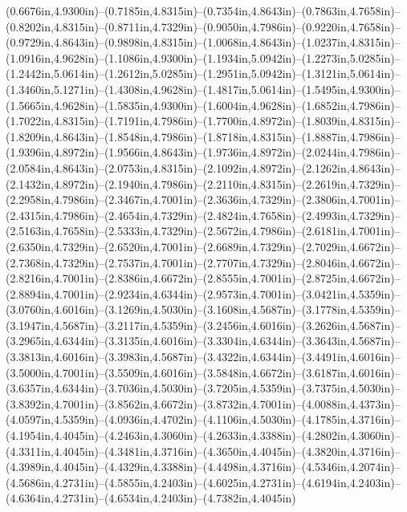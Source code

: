 (0.6676in,4.9300in)--(0.7185in,4.8315in)--(0.7354in,4.8643in)--(0.7863in,4.7658in)--(0.8202in,4.8315in)--(0.8711in,4.7329in)--(0.9050in,4.7986in)--(0.9220in,4.7658in)--(0.9729in,4.8643in)--(0.9898in,4.8315in)--(1.0068in,4.8643in)--(1.0237in,4.8315in)--(1.0916in,4.9628in)--(1.1086in,4.9300in)--(1.1934in,5.0942in)--(1.2273in,5.0285in)--(1.2442in,5.0614in)--(1.2612in,5.0285in)--(1.2951in,5.0942in)--(1.3121in,5.0614in)--(1.3460in,5.1271in)--(1.4308in,4.9628in)--(1.4817in,5.0614in)--(1.5495in,4.9300in)--(1.5665in,4.9628in)--(1.5835in,4.9300in)--(1.6004in,4.9628in)--(1.6852in,4.7986in)--(1.7022in,4.8315in)--(1.7191in,4.7986in)--(1.7700in,4.8972in)--(1.8039in,4.8315in)--(1.8209in,4.8643in)--(1.8548in,4.7986in)--(1.8718in,4.8315in)--(1.8887in,4.7986in)--(1.9396in,4.8972in)--(1.9566in,4.8643in)--(1.9736in,4.8972in)--(2.0244in,4.7986in)--(2.0584in,4.8643in)--(2.0753in,4.8315in)--(2.1092in,4.8972in)--(2.1262in,4.8643in)--(2.1432in,4.8972in)--(2.1940in,4.7986in)--(2.2110in,4.8315in)--(2.2619in,4.7329in)--(2.2958in,4.7986in)--(2.3467in,4.7001in)--(2.3636in,4.7329in)--(2.3806in,4.7001in)--(2.4315in,4.7986in)--(2.4654in,4.7329in)--(2.4824in,4.7658in)--(2.4993in,4.7329in)--(2.5163in,4.7658in)--(2.5333in,4.7329in)--(2.5672in,4.7986in)--(2.6181in,4.7001in)--(2.6350in,4.7329in)--(2.6520in,4.7001in)--(2.6689in,4.7329in)--(2.7029in,4.6672in)--(2.7368in,4.7329in)--(2.7537in,4.7001in)--(2.7707in,4.7329in)--(2.8046in,4.6672in)--(2.8216in,4.7001in)--(2.8386in,4.6672in)--(2.8555in,4.7001in)--(2.8725in,4.6672in)--(2.8894in,4.7001in)--(2.9234in,4.6344in)--(2.9573in,4.7001in)--(3.0421in,4.5359in)--(3.0760in,4.6016in)--(3.1269in,4.5030in)--(3.1608in,4.5687in)--(3.1778in,4.5359in)--(3.1947in,4.5687in)--(3.2117in,4.5359in)--(3.2456in,4.6016in)--(3.2626in,4.5687in)--(3.2965in,4.6344in)--(3.3135in,4.6016in)--(3.3304in,4.6344in)--(3.3643in,4.5687in)--(3.3813in,4.6016in)--(3.3983in,4.5687in)--(3.4322in,4.6344in)--(3.4491in,4.6016in)--(3.5000in,4.7001in)--(3.5509in,4.6016in)--(3.5848in,4.6672in)--(3.6187in,4.6016in)--(3.6357in,4.6344in)--(3.7036in,4.5030in)--(3.7205in,4.5359in)--(3.7375in,4.5030in)--(3.8392in,4.7001in)--(3.8562in,4.6672in)--(3.8732in,4.7001in)--(4.0088in,4.4373in)--(4.0597in,4.5359in)--(4.0936in,4.4702in)--(4.1106in,4.5030in)--(4.1785in,4.3716in)--(4.1954in,4.4045in)--(4.2463in,4.3060in)--(4.2633in,4.3388in)--(4.2802in,4.3060in)--(4.3311in,4.4045in)--(4.3481in,4.3716in)--(4.3650in,4.4045in)--(4.3820in,4.3716in)--(4.3989in,4.4045in)--(4.4329in,4.3388in)--(4.4498in,4.3716in)--(4.5346in,4.2074in)--(4.5686in,4.2731in)--(4.5855in,4.2403in)--(4.6025in,4.2731in)--(4.6194in,4.2403in)--(4.6364in,4.2731in)--(4.6534in,4.2403in)--(4.7382in,4.4045in) 
